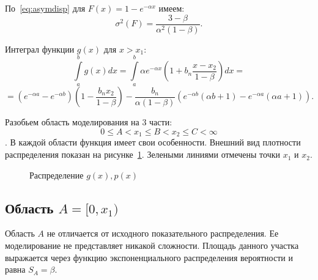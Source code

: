\documentclass[12pt, specialist, subf, substylefile = spbu.rtx]{disser}
\begin{document}
По~\eqref{eq:asymdisp} для $F(x)=1-e^{-\alpha x}$ имеем:
$$
\sigma^2(F)=\frac{3-\beta}{\alpha^2(1-\beta)}.
$$


Интеграл функции $g(x)$ для $x>x_1$:
$$
\int \limits_a^b g(x)dx=
\int \limits_a^b \alpha e^{-\alpha x}(1+b_n\frac{x-x_2}{1-\beta})dx = 
$$
\begin{equation}\label{eq:gint}
=(e^{-\alpha a}-e^{-\alpha b})(1-\frac{b_n x_2}{1-\beta})-
\frac{b_n}{\alpha(1-\beta)}\left(e^{-\alpha b}(\alpha b+1)-e^{-\alpha a}(\alpha a+1)\right).
\end{equation}


Разобьем область моделирования на 3 части: 
$$0 \le A < x_1 \le B < x_2 \le C < \infty$$.
В каждой области функция имеет свои особенности. Внешний вид плотности распределения показан на рисунке~\ref{ris:plot}. Зелеными линиями отмечены точки $x_1$ и $x_2$.

\begin{figure}[h]
\caption{Распределение $g(x), p(x)$}
\label{ris:plot}
\end{figure}



\subsection{Область $A=[0, x_1)$}

Область $A$ не отличается от исходного показательного распределения. Ее моделирование не представляет никакой сложности. Площадь данного участка выражается через функцию экспоненциального распределения вероятности и равна $S_A=\beta$.
\end{document}
